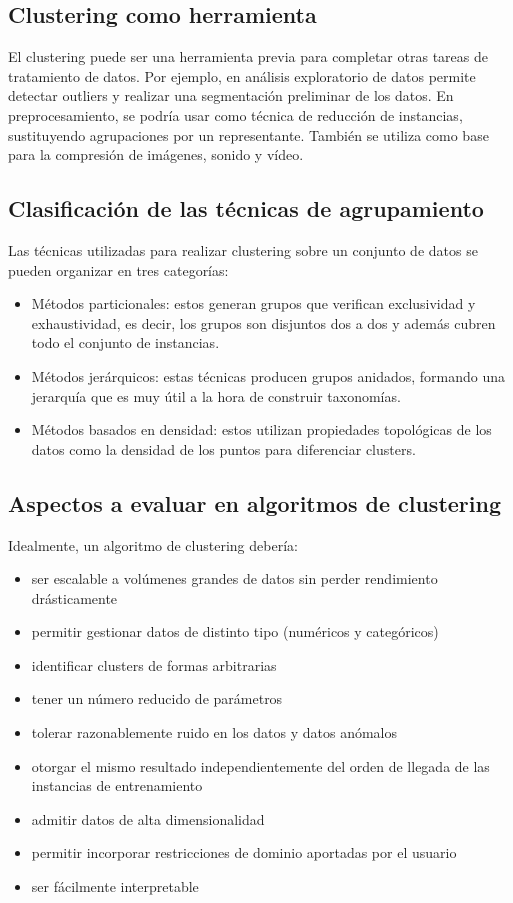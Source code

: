 \documentclass[a4paper,11pt,spanish]{report}
\let\stdsub\subsection
\let\stdsubsub\subsubsection
\renewcommand{\section}{\stdsub}
\renewcommand{\subsection}{\stdsubsub}
\begin{document}
\section{Clustering como herramienta}
\label{sec-1-1-2}

El clustering puede ser una herramienta previa para completar otras tareas de tratamiento de datos. Por ejemplo, en análisis exploratorio de datos permite detectar outliers y realizar una segmentación preliminar de los datos. En preprocesamiento, se podría usar como técnica de reducción de instancias, sustituyendo agrupaciones por un representante. También se utiliza como base para la compresión de imágenes, sonido y vídeo.

\section{Clasificación de las técnicas de agrupamiento}
\label{sec-1-1-3}

Las técnicas utilizadas para realizar clustering sobre un conjunto de datos se pueden organizar en tres categorías:

\begin{itemize}
\item Métodos particionales: estos generan grupos que verifican exclusividad y exhaustividad, es decir, los grupos son disjuntos dos a dos y además cubren todo el conjunto de instancias.
\item Métodos jerárquicos: estas técnicas producen grupos anidados, formando una jerarquía que es muy útil a la hora de construir taxonomías.
\item Métodos basados en densidad: estos utilizan propiedades topológicas de los datos como la densidad de los puntos para diferenciar clusters.
\end{itemize}


\section{Aspectos a evaluar en algoritmos de clustering}
\label{sec-1-1-4}

Idealmente, un algoritmo de clustering debería:
\begin{itemize}
\item ser escalable a volúmenes grandes de datos sin perder rendimiento drásticamente
\item permitir gestionar datos de distinto tipo (numéricos y categóricos)
\item identificar clusters de formas arbitrarias
\item tener un número reducido de parámetros
\item tolerar razonablemente ruido en los datos y datos anómalos
\item otorgar el mismo resultado independientemente del orden de llegada de las instancias de entrenamiento
\item admitir datos de alta dimensionalidad
\item permitir incorporar restricciones de dominio aportadas por el usuario
\item ser fácilmente interpretable
\end{itemize}
\end{document}
